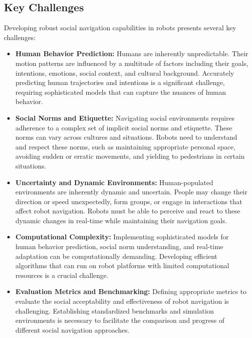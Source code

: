 
\subsection{Key Challenges}
\label{subsec:key_challenges}
Developing robust social navigation capabilities in robots presents several key challenges:

\begin{itemize}
    \item \textbf{Human Behavior Prediction:} Humans are inherently unpredictable. Their motion 
    patterns are influenced by a multitude of factors including their goals, intentions, 
    emotions, social context, and cultural background. Accurately predicting human trajectories 
    and intentions is a significant challenge, requiring sophisticated models that can capture 
    the nuances of human behavior.
    \item \textbf{Social Norms and Etiquette:} Navigating social environments requires adherence 
    to a complex set of implicit social norms and etiquette. These norms can vary across cultures 
    and situations. Robots need to understand and respect these norms, such as maintaining 
    appropriate personal space, avoiding sudden or erratic movements, and yielding to pedestrians 
    in certain situations.
    \item \textbf{Uncertainty and Dynamic Environments:} Human-populated environments are inherently 
    dynamic and uncertain. People may change their direction or speed unexpectedly, form groups, 
    or engage in interactions that affect robot navigation. Robots must be able to perceive and 
    react to these dynamic changes in real-time while maintaining their navigation goals.
    \item \textbf{Computational Complexity:} Implementing sophisticated models for human behavior 
    prediction, social norm understanding, and real-time adaptation can be computationally demanding. 
    Developing efficient algorithms that can run on robot platforms with limited computational 
    resources is a crucial challenge.
    \item \textbf{Evaluation Metrics and Benchmarking:} Defining appropriate metrics to evaluate 
    the social acceptability and effectiveness of robot navigation is challenging. Establishing 
    standardized benchmarks and simulation environments is necessary to facilitate the comparison 
    and progress of different social navigation approaches.
\end{itemize}

